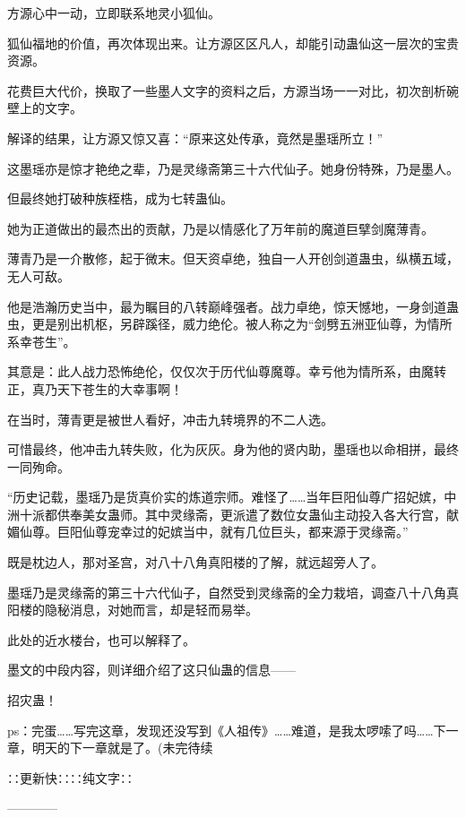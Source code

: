 \begin{this_body}
方源心中一动，立即联系地灵小狐仙。

狐仙福地的价值，再次体现出来。让方源区区凡人，却能引动蛊仙这一层次的宝贵资源。

花费巨大代价，换取了一些墨人文字的资料之后，方源当场一一对比，初次剖析碗壁上的文字。

解译的结果，让方源又惊又喜：“原来这处传承，竟然是墨瑶所立！”

这墨瑶亦是惊才艳绝之辈，乃是灵缘斋第三十六代仙子。她身份特殊，乃是墨人。

但最终她打破种族桎梏，成为七转蛊仙。

她为正道做出的最杰出的贡献，乃是以情感化了万年前的魔道巨擘剑魔薄青。

薄青乃是一介散修，起于微末。但天资卓绝，独自一人开创剑道蛊虫，纵横五域，无人可敌。

他是浩瀚历史当中，最为瞩目的八转巅峰强者。战力卓绝，惊天憾地，一身剑道蛊虫，更是别出机枢，另辟蹊径，威力绝伦。被人称之为“剑劈五洲亚仙尊，为情所系幸苍生”。

其意是：此人战力恐怖绝伦，仅仅次于历代仙尊魔尊。幸亏他为情所系，由魔转正，真乃天下苍生的大幸事啊！

在当时，薄青更是被世人看好，冲击九转境界的不二人选。

可惜最终，他冲击九转失败，化为灰灰。身为他的贤内助，墨瑶也以命相拼，最终一同殉命。

“历史记载，墨瑶乃是货真价实的炼道宗师。难怪了……当年巨阳仙尊广招妃嫔，中洲十派都供奉美女蛊师。其中灵缘斋，更派遣了数位女蛊仙主动投入各大行宫，献媚仙尊。巨阳仙尊宠幸过的妃嫔当中，就有几位巨头，都来源于灵缘斋。”

既是枕边人，那对圣宫，对八十八角真阳楼的了解，就远超旁人了。

墨瑶乃是灵缘斋的第三十六代仙子，自然受到灵缘斋的全力栽培，调查八十八角真阳楼的隐秘消息，对她而言，却是轻而易举。

此处的近水楼台，也可以解释了。

墨文的中段内容，则详细介绍了这只仙蛊的信息——

招灾蛊！

ps：完蛋……写完这章，发现还没写到《人祖传》……难道，是我太啰嗦了吗……下一章，明天的下一章就是了。(未完待续

∷更新快∷∷纯文字∷

------------

\end{this_body}

